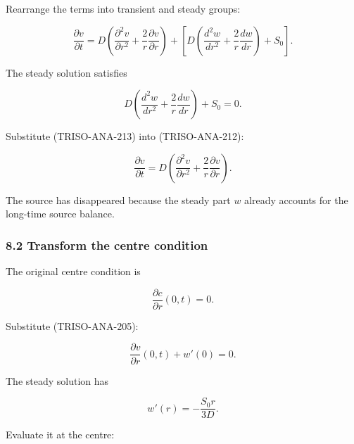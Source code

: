 \documentclass[11pt,a4paper]{article}
\begin{document}
Rearrange the terms into transient and steady groups:

\begin{equation}
\frac{\partial v}{\partial t}
=
D
\left(
\frac{\partial^2v}{\partial r^2}
+
\frac2r\frac{\partial v}{\partial r}
\right)
+
\left[
D
\left(
\frac{d^2w}{dr^2}
+
\frac2r\frac{dw}{dr}
\right)
+
S_0
\right].
\tag{TRISO-ANA-212}
\label{eq:triso-ana-212}
\end{equation}

The steady solution satisfies

\begin{equation}
D
\left(
\frac{d^2w}{dr^2}
+
\frac2r\frac{dw}{dr}
\right)
+
S_0
=
0.
\tag{TRISO-ANA-213}
\label{eq:triso-ana-213}
\end{equation}

Substitute (TRISO-ANA-213) into (TRISO-ANA-212):

\begin{equation}
\boxed{
\frac{\partial v}{\partial t}
=
D
\left(
\frac{\partial^2v}{\partial r^2}
+
\frac2r\frac{\partial v}{\partial r}
\right).
}
\tag{TRISO-ANA-214}
\label{eq:triso-ana-214}
\end{equation}

The source has disappeared because the steady part $w$ already accounts for the long-time source balance.

\subsubsection*{8.2 Transform the centre condition}

The original centre condition is

\begin{equation}
\frac{\partial c}{\partial r}(0,t)=0.
\tag{TRISO-ANA-215}
\label{eq:triso-ana-215}
\end{equation}

Substitute (TRISO-ANA-205):

\begin{equation}
\frac{\partial v}{\partial r}(0,t)+w'(0)=0.
\tag{TRISO-ANA-216}
\label{eq:triso-ana-216}
\end{equation}

The steady solution has

\begin{equation}
w'(r)=-\frac{S_0r}{3D}.
\tag{TRISO-ANA-217}
\label{eq:triso-ana-217}
\end{equation}

Evaluate it at the centre:
\end{document}
